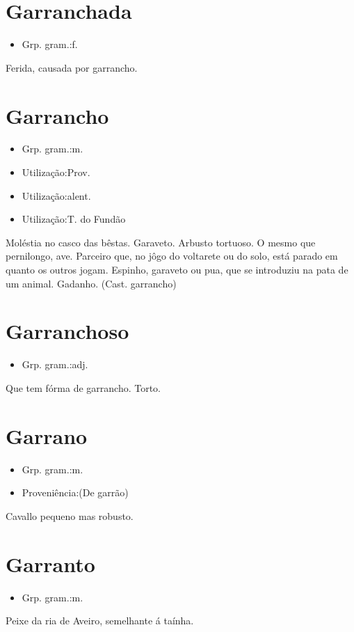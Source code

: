 \section{Garranchada}
\begin{itemize}
\item {Grp. gram.:f.}
\end{itemize}
Ferida, causada por garrancho.
\section{Garrancho}
\begin{itemize}
\item {Grp. gram.:m.}
\end{itemize}
\begin{itemize}
\item {Utilização:Prov.}
\end{itemize}
\begin{itemize}
\item {Utilização:alent.}
\end{itemize}
\begin{itemize}
\item {Utilização:T. do Fundão}
\end{itemize}
Moléstia no casco das bêstas.
Garaveto.
Arbusto tortuoso.
O mesmo que \textunderscore pernilongo\textunderscore , ave.
Parceiro que, no jôgo do voltarete ou do solo, está parado em quanto os outros jogam.
Espinho, garaveto ou pua, que se introduziu na pata de um animal.
Gadanho.
(Cast. \textunderscore garrancho\textunderscore )
\section{Garranchoso}
\begin{itemize}
\item {Grp. gram.:adj.}
\end{itemize}
Que tem fórma de garrancho.
Torto.
\section{Garrano}
\begin{itemize}
\item {Grp. gram.:m.}
\end{itemize}
\begin{itemize}
\item {Proveniência:(De \textunderscore garrão\textunderscore )}
\end{itemize}
Cavallo pequeno mas robusto.
\section{Garranto}
\begin{itemize}
\item {Grp. gram.:m.}
\end{itemize}
Peixe da ria de Aveiro, semelhante á taínha.
